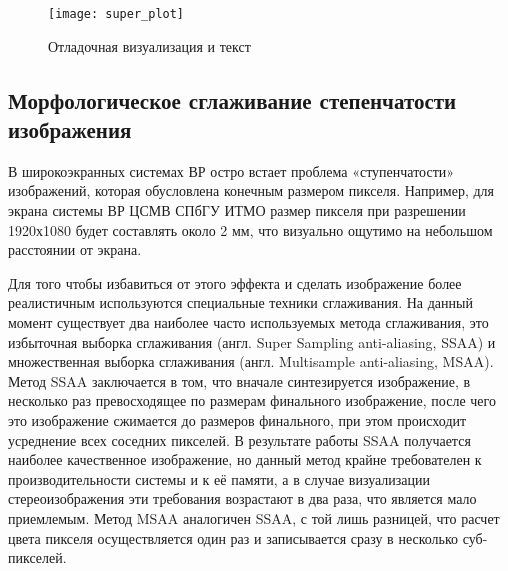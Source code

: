 \begin{figure}[ht]
\begin{center}
\texttt{[image: super\_plot]}
\end{center}
\caption{Отладочная визуализация и текст}
\label{super_plot}
\end{figure}

%

\subsection{Морфологическое сглаживание степенчатости изображения}
В широкоэкранных системах ВР остро встает проблема «ступенчатости» изображений, которая обусловлена конечным размером пикселя. Например, для экрана системы ВР ЦСМВ СПбГУ ИТМО размер пикселя при разрешении 1920х1080 будет составлять около 2 мм, что визуально ощутимо на небольшом расстоянии от экрана. 

Для того чтобы избавиться от этого эффекта и сделать изображение более реалистичным используются специальные техники сглаживания.
На данный момент существует два наиболее часто используемых метода сглаживания, это избыточная выборка сглаживания (англ. Super Sampling anti-aliasing, SSAA) и множественная выборка сглаживания (англ. Multisample anti-aliasing, MSAA). Метод SSAA заключается в том, что вначале синтезируется изображение, в несколько раз превосходящее по размерам финального изображение, после чего это изображение сжимается до размеров финального, при этом происходит усреднение всех соседних пикселей. В результате работы SSAA получается наиболее качественное изображение, но данный метод крайне требователен к производительности системы и к её памяти, а в случае визуализации стереоизображения эти требования возрастают в два раза, что является мало приемлемым. Метод MSAA аналогичен SSAA, с той лишь разницей, что расчет цвета пикселя осуществляется один раз и записывается сразу в несколько суб-пикселей.

